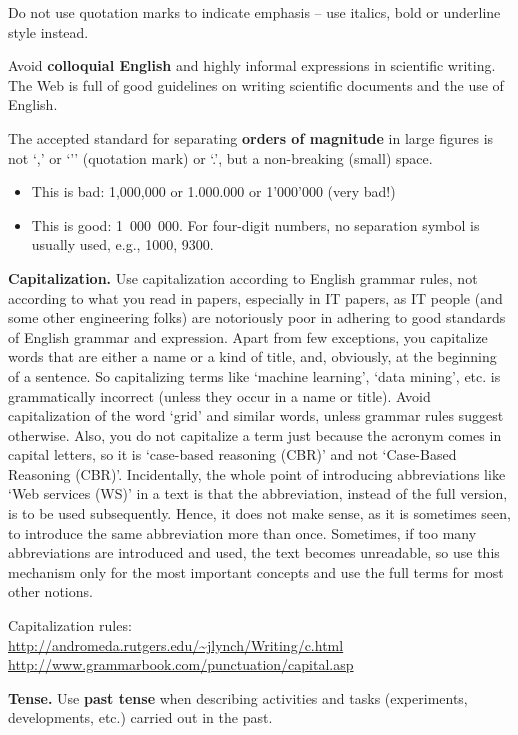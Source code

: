 \documentclass{newseye_del}
\begin{document}
Do not use quotation marks to indicate emphasis -- use italics, bold or
underline style instead.

Avoid \textbf{colloquial English} and highly informal expressions in scientific
writing. The Web is full of good guidelines on writing scientific documents and
the use of English.

The accepted standard for separating \textbf{orders of magnitude} in large
figures is not `,' or `'' (quotation mark) or `.', but a non-breaking (small)
space.

\begin{itemize}
    \item This is bad: 1,000,000 or 1.000.000 or 1'000'000 (very bad!)
    \item This is good: 1~000~000. For four-digit numbers, no separation
      symbol is usually used, e.g., 1000, 9300.
\end{itemize}

\textbf{Capitalization.} Use capitalization according to English grammar rules,
not according to what you read in papers, especially in IT papers, as IT people
(and some other engineering folks) are notoriously poor in adhering to good
standards of English grammar and expression. Apart from few exceptions, you
capitalize words that are either a name or a kind of title, and, obviously, at
the beginning of a sentence. So capitalizing terms like `machine learning',
`data mining', etc. is grammatically incorrect (unless they occur in a name or
title). Avoid capitalization of the word `grid' and similar words, unless
grammar rules suggest otherwise. Also, you do not capitalize a term just because
the acronym comes in capital letters, so it is `case-based reasoning (CBR)' and
not `Case-Based Reasoning (CBR)'. Incidentally, the whole point of introducing
abbreviations like `Web services (WS)' in a text is that the abbreviation,
instead of the full version, is to be used subsequently. Hence, it does not make
sense, as it is sometimes seen, to introduce the same abbreviation more than
once. Sometimes, if too many abbreviations are introduced and used, the text
becomes unreadable, so use this mechanism only for the most important concepts
and use the full terms for most other notions.

Capitalization rules:\\
\url{http://andromeda.rutgers.edu/~jlynch/Writing/c.html}\\
\url{http://www.grammarbook.com/punctuation/capital.asp}

\textbf{Tense.} Use \textbf{past tense} when describing activities and tasks
(experiments, developments, etc.) carried out in the past.
\end{document}
